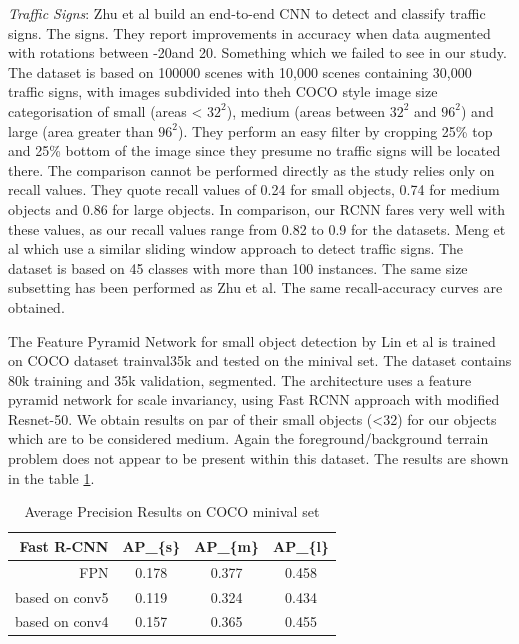 \documentclass{IEEEtran}
\begin{document}
\textit{Traffic Signs}: Zhu et al \cite{Zhu2016} build an end-to-end CNN to detect and classify traffic signs. The signs. They report improvements in accuracy when data augmented with rotations between -20\degree and 20\degree. Something which we failed to see in our study. The dataset is based on 100000 scenes with 10,000 scenes containing 30,000 traffic signs, with images subdivided into theh COCO style image size categorisation of small (areas < $32^2$), medium (areas between $32^2$ and $96^2$) and large (area greater than $96^2$). They perform an easy filter by cropping 25\% top and 25\% bottom of the image since they presume no traffic signs will be located there. The comparison cannot be performed directly as the study relies only on recall values. They quote recall values of 0.24 for small objects, 0.74 for medium objects and 0.86 for large objects. In comparison, our RCNN fares very well with these values, as our recall values range from 0.82 to 0.9 for the datasets. Meng et al \cite{Meng2017} which use a similar sliding window approach to detect traffic signs. The dataset is based on 45 classes with more than 100 instances. The same size subsetting has been performed as Zhu et al\cite{Zhu2016}. The same recall-accuracy curves are obtained. \newline

The Feature Pyramid Network for small object detection by Lin et al \cite{Lin2017a} is trained on COCO dataset trainval35k and tested on the minival set. The dataset contains 80k training and 35k validation, segmented. The architecture uses a feature pyramid network for scale invariancy, using Fast RCNN approach with modified Resnet-50. We obtain results on par of their small objects (<32) for our objects which are to be considered medium. Again the foreground/background terrain problem does not appear to be present within this dataset. The results are shown in the table \ref{fpnresults}.

\begin{table}[]
\centering
\caption{Average Precision Results on COCO minival set}
\label{fpnresults}
\begin{tabular}{rccc}
\hline
\textbf{Fast R-CNN} & \textbf{AP\_\{s\}} & \multicolumn{1}{c|}{\textbf{AP\_\{m\}}} & \multicolumn{1}{c|}{\textbf{AP\_\{l\}}} \\ \hline
FPN                 & 0.178              & 0.377                                   & 0.458                                   \\
based on conv5      & 0.119              & 0.324                                   & 0.434                                   \\
based on conv4      & 0.157              & 0.365                                   & 0.455                                  
\end{tabular}
\end{table}
\end{document}
